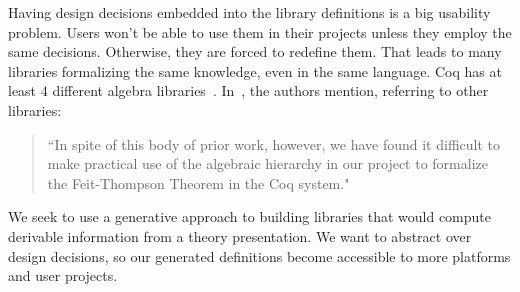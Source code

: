 Having design decisions embedded into the library definitions is a big usability problem. Users won't be able to use them in their projects unless they employ the same decisions. Otherwise, they are forced to redefine them. That leads to many libraries formalizing the same knowledge, even in the same language. Coq has at least $4$ different algebra libraries~\cite{Gonthier2009,Geuvers2002,coq-contribs-algebra,Spitters2010}. In~\cite{Gonthier2009}, the authors mention, referring to other libraries:  
\begin{quote}
    ``In spite of this body of prior work, however, we have found it
    difficult to make practical use of the algebraic hierarchy in our project to
    formalize the Feit-Thompson Theorem in the Coq system."
\end{quote}

We seek to use a generative approach to building libraries that would compute derivable information from a theory presentation. We want to abstract over design decisions, so our generated definitions become accessible to more platforms and user projects.  

